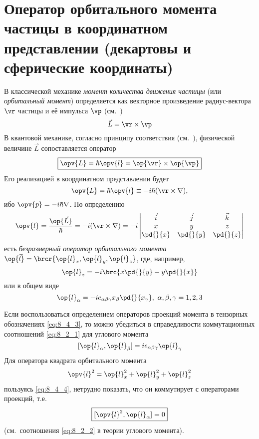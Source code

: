 \section{Оператор орбитального момента частицы в координатном представлении (декартовы и сферические координаты)}

В классической механике {\em момент количества движения частицы} (или {\em орбитальный момент}) определяется как векторное произведение радиус-вектора $\vr$ частицы и её импульса $\vp$ (см.~)
$$
\vec{L} = \vr \times \vp
$$%
%
В квантовой механике, согласно принципу соответствия (см.~), физической величине $\vec{L}$ сопоставляется оператор
\begin{equation}
\label{eq:8_4_1}
\boxed{
  \opv{L} = \hbar \opv{l} = \op{\vr} \times \op{\vp}
}
\end{equation}%
%
Его реализацией в координатном представлении будет
\begin{equation}
\label{eq:8_4_2}
  \opv{L} = \hbar \opv{l} \equiv -i\hbar(\vr \times \nabla),
\end{equation}%
%
ибо $\opv{p} = -i\hbar\nabla$. По определению
$$
\opv{l} = \frac{\op{\vec L}}{\hbar} = -i(\vr \times \nabla) = -i \left| 
  \begin{matrix}
  \vec{i} & \vec{j} & \vec{k}\\
  x & y & z\\
  \pd{}{x} & \pd{}{y} & \pd{}{z}\\
  \end{matrix}
  \right |
$$%
%
есть {\em безразмерный оператор орбитального момента} $\op{\vec l} = \brcr{\op{l}_x, \op{l}_y, \op{l}_z}$, где, например,
$$
  \op{l}_z = -i \brc{x \pd{}{y} - y \pd{}{x}}
$$%
%
или в общем виде
\begin{equation}
\label{eq:8_4_3}
  \op{l}_\alpha = -i e_{\alpha \beta \gamma} x_\beta \pd{}{x_\gamma},~\alpha, \beta, \gamma = 1, 2, 3
\end{equation}

Если воспользоваться определением операторов проекций момента в тензорных обозначениях \eqref{eq:8_4_3}, то можно убедиться в справедливости коммутационных соотношений \eqref{eq:8_2_1} для углового момента
\begin{equation}
\label{eq:8_4_4}
  [\op{l}_\alpha, \op{l}_\beta] = i e_{\alpha \beta \gamma} \op{l}_\gamma
\end{equation}%
%
Для оператора квадрата орбитального момента
$$
\opv{l}^2 = \op{l}^2_x + \op{l}^2_y + \op{l}^2_z
$$%
%
пользуясь \eqref{eq:8_4_4}, нетрудно показать, что он коммутирует с операторами проекций, т.е.
\begin{equation}
\label{eq:8_4_5}
  \boxed{[\opv{l}^2, \op{l}_\alpha] = 0}
\end{equation}%
%
(см.~соотношения \eqref{eq:8_2_2} в теории углового момента).

